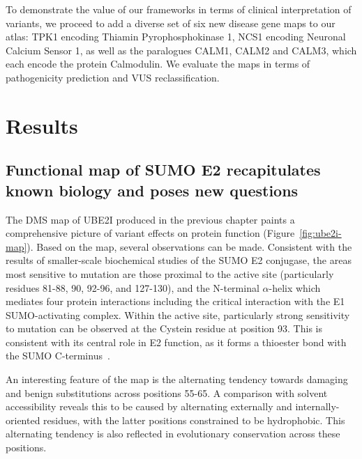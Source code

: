 To demonstrate the value of our frameworks in terms of clinical interpretation of variants, we proceed to add a diverse set of six new disease gene maps to our atlas: TPK1 encoding Thiamin Pyrophosphokinase 1, NCS1 encoding Neuronal Calcium Sensor 1, as well as the paralogues CALM1, CALM2 and CALM3, which each encode the protein Calmodulin. We evaluate the maps in terms of pathogenicity prediction and VUS reclassification.

\section{Results}


\subsection{Functional map of SUMO E2 recapitulates known biology and poses new questions}


The DMS map of UBE2I produced in the previous chapter paints a comprehensive picture of variant effects on protein function (Figure~\ref{fig:ube2i-map}). Based on the map, several observations can be made. Consistent with the results of smaller-scale biochemical studies of the SUMO E2 conjugase\cite{bencsath_identification_2002,bernier-villamor_structural_2002}, the areas most sensitive to mutation are those proximal to the active site (particularly residues 81-88, 90, 92-96, and 127-130), and the N-terminal $\alpha$-helix which mediates four protein interactions including the critical interaction with the E1 SUMO-activating complex. Within the active site, particularly strong sensitivity to mutation can be observed at the Cystein residue at position 93. This is consistent with its central role in E2 function, as it forms a thioester bond with the SUMO C-terminus~\cite{bernier-villamor_structural_2002}.

An interesting feature of the map is the alternating tendency towards damaging and benign substitutions across positions 55-65. A comparison with solvent accessibility reveals this to be caused by alternating externally and internally-oriented residues, with the latter positions constrained to be hydrophobic. This alternating tendency is also reflected in evolutionary conservation across these positions. 

